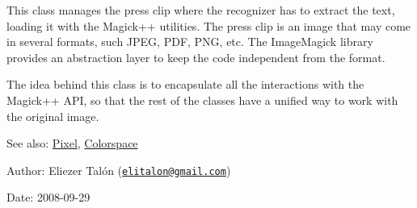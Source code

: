 This class manages the press clip where the recognizer has to extract the text, loading it with the Magick++ utilities. The press clip is an image that may come in several formats, such JPEG, PDF, PNG, etc. The ImageMagick library provides an abstraction layer to keep the code independent from the format.

The idea behind this class is to encapsulate all the interactions with the Magick++ API, so that the rest of the classes have a unified way to work with the original image.

\begin{Desc}
\item[See also:]\hyperlink{class_pixel}{Pixel}, \hyperlink{_colorspace_8h_7a7e24cdb2a27271343f0adceff89f65}{Colorspace}\end{Desc}
\begin{Desc}
\item[Author:]Eliezer Talón (\href{mailto:elitalon@gmail.com}{\tt elitalon@gmail.com}) \end{Desc}
\begin{Desc}
\item[Date:]2008-09-29 \end{Desc}


